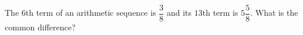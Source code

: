 The $6$th term of an arithmetic sequence is $\dfrac{3}{8}$ and its $13$th term is $5\dfrac{5}{8}$. What is the common difference?

